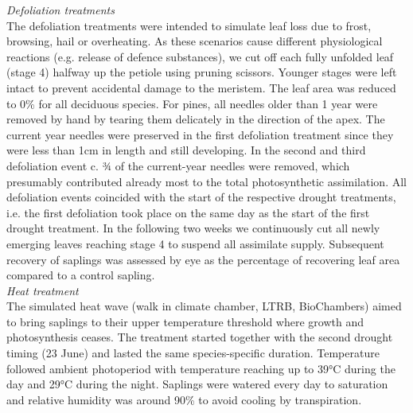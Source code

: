 \documentclass{article}
\begin{document}
	
	\textit{Defoliation treatments} \\
	The defoliation treatments were intended to simulate leaf loss due to frost, browsing, hail or overheating. As these scenarios cause different physiological reactions (e.g. release of defence substances), we cut off each fully unfolded leaf (stage 4) halfway up the petiole using pruning scissors. Younger stages were left intact to prevent accidental damage to the meristem. The leaf area was reduced to 0\% for all deciduous species. For pines, all needles older than 1 year were removed by hand by tearing them delicately in the direction of the apex. The current year needles were preserved in the first defoliation treatment since they were less than 1cm in length and still developing. In the second and third defoliation event c. ¾ of the current-year needles were removed, which presumably contributed already most to the total photosynthetic assimilation. All defoliation events coincided with the start of the respective drought treatments, i.e. the first defoliation took place on the same day as the start of the first drought treatment. In the following two weeks we continuously cut all newly emerging leaves reaching stage 4 to suspend all assimilate supply. %
	Subsequent recovery of saplings was assessed by eye as the percentage of recovering leaf area compared to a control sapling. \\
	
	\textit{Heat treatment} \\
	The simulated heat wave (walk in climate chamber, LTRB, BioChambers) aimed to bring saplings to their upper temperature threshold where growth and photosynthesis ceases. The treatment started together with the second drought timing (23 June) and lasted the same species-specific duration. Temperature followed ambient photoperiod with temperature reaching up to 39°C during the day and 29°C during the night. Saplings were watered every day to saturation and relative humidity was around 90\% to avoid cooling by transpiration. 
	
\end{document}
